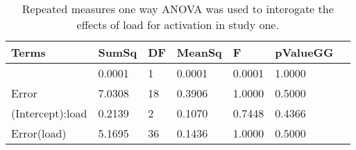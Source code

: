 \begin{table}
\centering
\begin{tabular}[0.2em]{@{}lllllll@{}}\toprule
Terms & SumSq & DF & MeanSq & F & pValueGG\\\toprule[0.2em]
(Intercept) & 0.0001 & 1 & 0.0001 & 0.0001 & 1.0000 \\\midrule
Error & 7.0308 & 18 & 0.3906 & 1.0000 & 0.5000 \\\midrule
(Intercept):load & 0.2139 & 2 & 0.1070 & 0.7448 & 0.4366 \\\midrule
Error(load) & 5.1695 & 36 & 0.1436 & 1.0000 & 0.5000 \\\bottomrule[0.2em]
\end{tabular}
\caption{Repeated measures one way ANOVA was used to interogate the effects of load for activation in study one.\label{tabel:tbl_RMABA1}}
\end{table}
